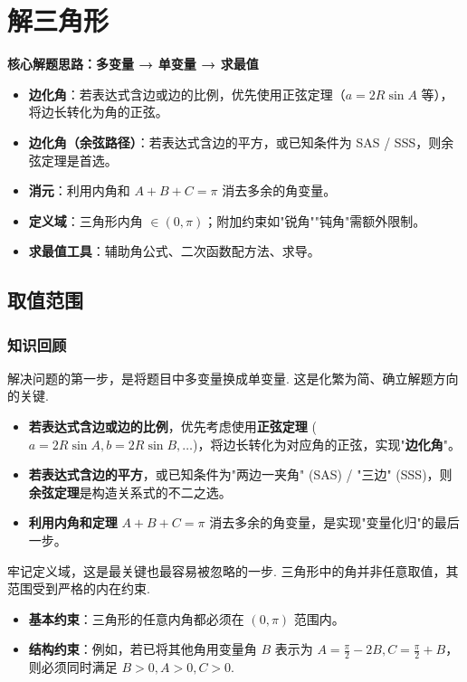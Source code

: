 \chapter{解三角形}

\begin{knowledgeframe}
\textbf{核心解题思路：多变量 → 单变量 → 求最值}
\begin{itemize}
	\item \textbf{边化角}：若表达式含边或边的比例，优先使用正弦定理（$a=2R\sin A$ 等），将边长转化为角的正弦。
	\item \textbf{边化角（余弦路径）}：若表达式含边的平方，或已知条件为 SAS / SSS，则余弦定理是首选。
	\item \textbf{消元}：利用内角和 $A+B+C=\pi$ 消去多余的角变量。
	\item \textbf{定义域}：三角形内角 $\in (0, \pi)$；附加约束如"锐角""钝角"需额外限制。
	\item \textbf{求最值工具}：辅助角公式、二次函数配方法、求导。
\end{itemize}
\end{knowledgeframe}

\section{取值范围}

\subsection*{知识回顾}

解决问题的第一步，是将题目中多变量换成单变量. 这是化繁为简、确立解题方向的关键.
\begin{itemize}
	\item \textbf{若表达式含边或边的比例}，优先考虑使用\textbf{正弦定理} ($a=2R\sin A, b=2R\sin B, \dots$)，将边长转化为对应角的正弦，实现"\textbf{边化角}"。
	\item \textbf{若表达式含边的平方}，或已知条件为"两边一夹角" (SAS) / "三边" (SSS)，则\textbf{余弦定理}是构造关系式的不二之选。
	\item \textbf{利用内角和定理} $A+B+C=\pi$ 消去多余的角变量，是实现"变量化归"的最后一步。
\end{itemize}

牢记定义域，这是最关键也最容易被忽略的一步. 三角形中的角并非任意取值，其范围受到严格的内在约束.
\begin{itemize}
	\item \textbf{基本约束}：三角形的任意内角都必须在 $(0, \pi)$ 范围内。
	\item \textbf{结构约束}：例如，若已将其他角用变量角 $B$ 表示为 $A=\frac{\pi}{2}-2B, C=\frac{\pi}{2}+B$，则必须同时满足 $B>0, A>0, C>0$.
\end{itemize}

